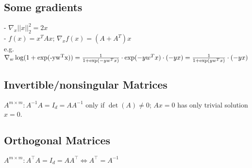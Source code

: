 \subsection*{Some gradients}
- $\nabla_x ||x||_2^2 = 2 x$\\
- $f(x) = x^T A x$; $\nabla_x f(x) = (A + A^T) x$\\
 e.g. $\nabla_w \operatorname{log}(1+\operatorname{exp(-y w^T x)}) = \\
\frac{1}{1+\operatorname{exp}(-y w^T x)} \cdot \operatorname{exp}(-y w^T x) \cdot (-y x) = \\
\frac{1}{1 + \operatorname{exp}(y w^T x)} \cdot(-yx)$

\begin{comment}
\subsection*{Convex / Jensen's inequality}
$\text{g(x) convex} \Leftrightarrow g''(x) > 0 \Leftrightarrow x_1,x_2 \in \mathbb{R}, \lambda \in [0,1]: 
g(\lambda x_1 + (1-\lambda) x_2) \leq \lambda g(x_1) + (1-\lambda) g(x_2)$


\subsection*{Gaussian / Normal Distribution}
$f(x) = \frac{1}{\sqrt{2\pi\sigma^2}} exp(-\frac{(x-\mu)^2}{2\sigma^2})$

\subsection*{Multivariate Gaussian}
$\Sigma =$ covariance matrix, $\mu$ = mean\\
$f(x) = \frac{1}{2\pi \sqrt{|\Sigma|}} e^{- \frac{1}{2} (x-\mu)^T \Sigma^{-1} (x-\mu)}$\\
Empirical: $\hat{\Sigma} = \frac{1}{n}\sum_{i=1}^n x_i x_i^T$ (needs centered data points)
\end{comment}

\subsection*{Invertible/nonsingular Matrices}
$A^{m\times m } : A^{-1}A = I_d = AA^{-1}$ only if $\det(A) \neq 0$; $Ax = 0$ has only trivial solution $x=0$. 

\subsection*{Orthogonal Matrices}
$A^{m\times m } : A^{\top}A = I_d = AA^{\top} \Leftrightarrow A^{\top} = A^{-1}$ 


